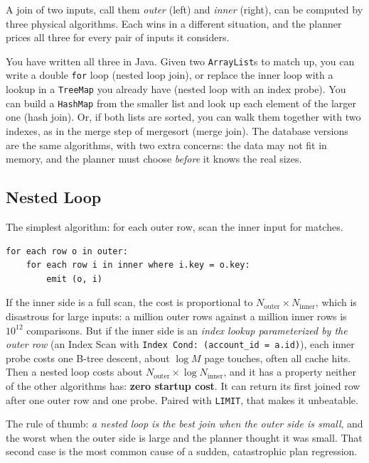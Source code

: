 A join of two inputs, call them \emph{outer} (left) and \emph{inner} (right), can be computed by three physical algorithms. Each wins in a different situation, and the planner prices all three for every pair of inputs it considers.

You have written all three in Java. Given two \texttt{ArrayList}s to match up, you can write a double \texttt{for} loop (nested loop join), or replace the inner loop with a lookup in a \texttt{TreeMap} you already have (nested loop with an index probe). You can build a \texttt{HashMap} from the smaller list and look up each element of the larger one (hash join). Or, if both lists are sorted, you can walk them together with two indexes, as in the merge step of mergesort (merge join). The database versions are the same algorithms, with two extra concerns: the data may not fit in memory, and the planner must choose \emph{before} it knows the real sizes.

\subsection{Nested Loop}

The simplest algorithm: for each outer row, scan the inner input for matches.

\begin{lstlisting}[language=Plain]
for each row o in outer:
    for each row i in inner where i.key = o.key:
        emit (o, i)
\end{lstlisting}

If the inner side is a full scan, the cost is proportional to $N_{\text{outer}} \times N_{\text{inner}}$, which is disastrous for large inputs: a million outer rows against a million inner rows is $10^{12}$ comparisons. But if the inner side is an \emph{index lookup parameterized by the outer row} (an Index Scan with \texttt{Index Cond: (account\_id = a.id)}), each inner probe costs one B-tree descent, about $\log M$ page touches, often all cache hits. Then a nested loop costs about $N_{\text{outer}} \times \log N_{\text{inner}}$, and it has a property neither of the other algorithms has: \textbf{zero startup cost}. It can return its first joined row after one outer row and one probe. Paired with \texttt{LIMIT}, that makes it unbeatable.

The rule of thumb: \emph{a nested loop is the best join when the outer side is small}, and the worst when the outer side is large and the planner thought it was small. That second case is the most common cause of a sudden, catastrophic plan regression.

